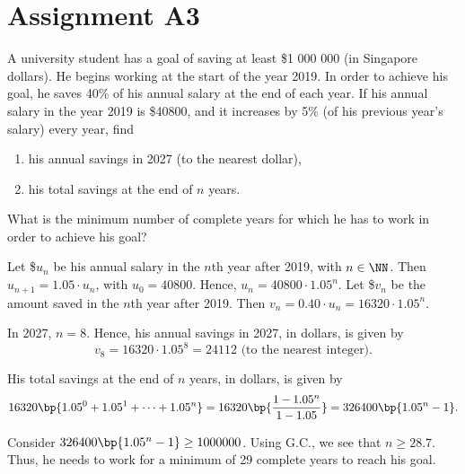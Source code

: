 \clearpage
\section{Assignment A3}

\begin{problem}
    A university student has a goal of saving at least \$1 000 000 (in Singapore dollars). He begins working at the start of the year 2019. In order to achieve his goal, he saves 40\% of his annual salary at the end of each year. If his annual salary in the year 2019 is \$40800, and it increases by 5\% (of his previous year's salary) every year, find

    \begin{enumerate}
        \item his annual savings in 2027 (to the nearest dollar),
        \item his total savings at the end of $n$ years.
    \end{enumerate}

        What is the minimum number of complete years for which he has to work in order to achieve his goal?
\end{problem}
\begin{solution}
    Let \$$u_n$ be his annual salary in the $n$th year after 2019, with $n \in \NN$. Then $u_{n+1} = 1.05\cdot u_n$, with $u_0 = 40800$. Hence, $u_n = 40800 \cdot 1.05^n$. Let \$$v_n$ be the amount saved in the $n$th year after 2019. Then $v_n = 0.40 \cdot u_n = 16320 \cdot 1.05^n$.

    \begin{ppart}
        In 2027, $n = 8$. Hence, his annual savings in 2027, in dollars, is given by \[v_8 = 16320 \cdot 1.05^8 = 24112 \text{ (to the nearest integer)}.\]
    \end{ppart}
    \begin{ppart}
        His total savings at the end of $n$ years, in dollars, is given by \[16320\bp{1.05^0 + 1.05^1 + \cdots + 1.05^n} = 16320 \bp{\frac{1 - 1.05^n}{1-1.05}} = 326400 \bp{1.05^n - 1}.\]
    \end{ppart}

    Consider $326400 \bp{1.05^n - 1} \geq 1 000 000$. Using G.C., we see that $n \geq 28.7$. Thus, he needs to work for a minimum of 29 complete years to reach his goal.
\end{solution}

